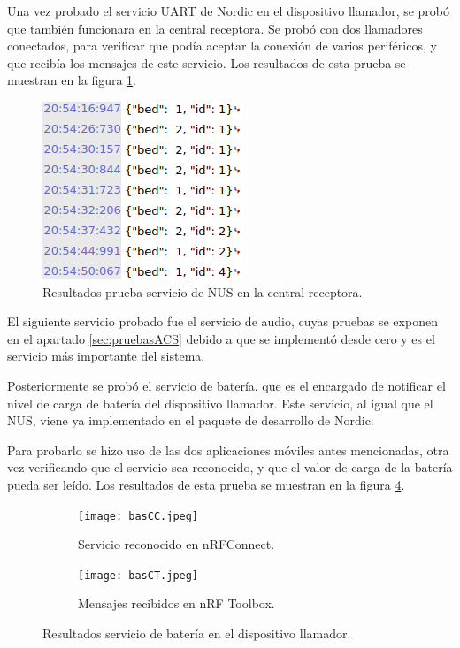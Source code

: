 Una vez probado el servicio UART de Nordic en el dispositivo llamador, se probó que también funcionara en la central receptora. Se probó con dos llamadores conectados, para verificar que podía aceptar la conexión de varios periféricos, y que recibía los mensajes de este servicio. Los resultados de esta prueba se muestran en la figura \ref{fig:Pnus2}.

\begin{figure}[htpb]
	\centering
	\includegraphics[scale=0.7]{./Figures/Pnus2.png}
	\caption{Resultados prueba servicio de NUS en la central receptora.}
	\label{fig:Pnus2}
\end{figure}

El siguiente servicio probado  fue el servicio de audio, cuyas pruebas se exponen en el apartado \ref{sec:pruebasACS} debido a que se implementó desde cero y es el servicio más importante del sistema.

Posteriormente se probó el servicio de batería, que es el encargado de notificar el nivel de carga de batería del dispositivo llamador. Este servicio, al igual que el NUS, viene ya implementado en el paquete de desarrollo de Nordic.

Para probarlo se hizo uso de las dos aplicaciones móviles antes mencionadas, otra vez verificando que el servicio sea reconocido, y que el valor de carga de la batería pueda ser leído. Los resultados de esta prueba se muestran en la figura \ref{fig:Pbas}.

\begin{figure}[htpb]
	\centering
   	\begin{subfigure}[b]{1\textwidth}
   		\centering
      	\texttt{[image: basCC.jpeg]}
      	\caption{Servicio reconocido en nRFConnect.}
      	\label{fig:PbasA}
   	\end{subfigure}%
   	\newline
   	\begin{subfigure}[b]{1\textwidth}
   		\centering
      	\texttt{[image: basCT.jpeg]}
      	\caption{Mensajes recibidos en nRF Toolbox.}
      	\label{fig:PbasB}
   	\end{subfigure}%
	\caption{Resultados servicio de batería en el dispositivo llamador.}
	\label{fig:Pbas}
\end{figure}

